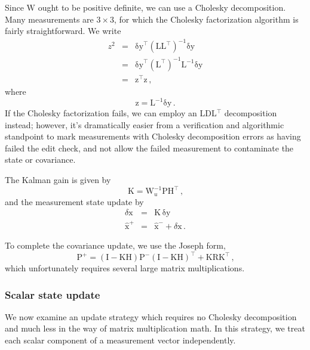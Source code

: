 \documentclass[12pt]{article}
\begin{document}
Since $\mathrm{W}$ ought to be positive definite, we can use a Cholesky decomposition. Many measurements are $3\times 3$, for which the Cholesky factorization algorithm is fairly straightforward. We write
\begin{eqnarray*}
z^2 &=& \mathrm{\delta y}^\top \left( \mathrm{L} \mathrm{L}^\top \right)^{-1}\mathrm{\delta y} \nonumber \\
      &=& \mathrm{\delta y}^\top \left( \mathrm{L}^\top \right)^{-1} \mathrm{L}^{-1} \mathrm{\delta y} \nonumber \\
      &=& \mathrm{z}^\top \mathrm{z}\,\text{,}
\end{eqnarray*}
where
\begin{equation}
\mathrm{z} = \mathrm{L}^{-1} \mathrm{\delta y}\,\text{.}
\end{equation}
If the Cholesky factorization fails, we can employ an LDL$^\top$ decomposition instead; however, it's dramatically easier from a verification and algorithmic standpoint to mark measurements with Cholesky decomposition errors as having failed the edit check, and not allow the failed measurement to contaminate the state or covariance.

The Kalman gain is given by
\begin{equation}
\mathrm{K} = \mathrm{W}_u^{-1} \mathrm{P}\mathrm{H}^\top\,\text{,}
\end{equation}
and the measurement state update by
\begin{eqnarray}
\delta\mathrm{x} &=& \mathrm{K}\,\mathrm{\delta y} \\
\hat{\mathrm{x}}^{+} &=& \hat{\mathrm{x}}^{-} + \delta\mathrm{x}\,\text{.}
\end{eqnarray}

To complete the covariance update, we use the Joseph form,
\begin{equation}
\mathrm{P}^{+} = \left( \mathrm{I} - \mathrm{K} \mathrm{H} \right) \mathrm{P}^{-} \left( \mathrm{I} - \mathrm{K} \mathrm{H} \right)^\top + \mathrm{K} \mathrm{R} \mathrm{K}^\top\,\text{,} \label{eq:joseph_form}
\end{equation}
which unfortunately requires several large matrix multiplications.

\subsubsection{Scalar state update}

We now examine an update strategy which requires no Cholesky decomposition and much less in the way of matrix multiplication math. In this strategy, we treat each scalar component of a measurement vector independently.
\end{document}
